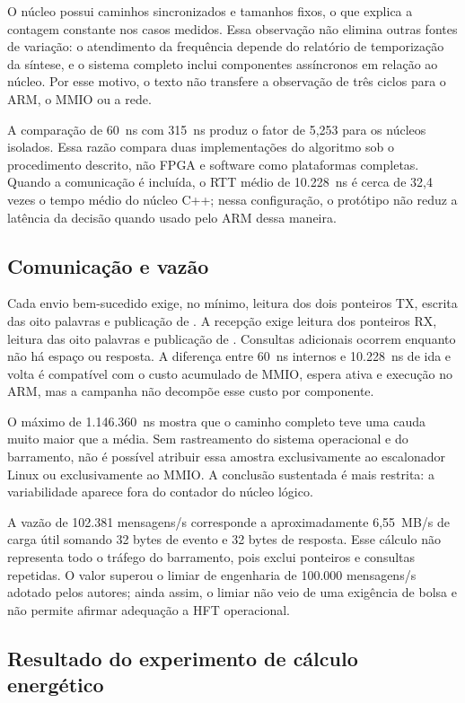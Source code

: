 O núcleo possui caminhos sincronizados e tamanhos fixos, o que explica a contagem constante nos casos medidos. Essa observação não elimina outras fontes de variação: o atendimento da frequência depende do relatório de temporização da síntese, e o sistema completo inclui componentes assíncronos em relação ao núcleo. Por esse motivo, o texto não transfere a observação de três ciclos para o ARM, o MMIO ou a rede.

A comparação de 60~ns com 315~ns produz o fator de 5,253 para os núcleos isolados. Essa razão compara duas implementações do algoritmo sob o procedimento descrito, não FPGA e software como plataformas completas. Quando a comunicação é incluída, o RTT médio de 10.228~ns é cerca de 32,4 vezes o tempo médio do núcleo C++; nessa configuração, o protótipo não reduz a latência da decisão quando usado pelo ARM dessa maneira.

\subsection{Comunicação e vazão}\label{subsec:gargaloMMIO}

Cada envio bem-sucedido exige, no mínimo, leitura dos dois ponteiros TX, escrita das oito palavras e publicação de . A recepção exige leitura dos ponteiros RX, leitura das oito palavras e publicação de . Consultas adicionais ocorrem enquanto não há espaço ou resposta. A diferença entre 60~ns internos e 10.228~ns de ida e volta é compatível com o custo acumulado de MMIO, espera ativa e execução no ARM, mas a campanha não decompõe esse custo por componente.

O máximo de 1.146.360~ns mostra que o caminho completo teve uma cauda muito maior que a média. Sem rastreamento do sistema operacional e do barramento, não é possível atribuir essa amostra exclusivamente ao escalonador Linux ou exclusivamente ao MMIO. A conclusão sustentada é mais restrita: a variabilidade aparece fora do contador do núcleo lógico.

A vazão de 102.381 mensagens/s corresponde a aproximadamente 6,55~MB/s de carga útil somando 32 bytes de evento e 32 bytes de resposta. Esse cálculo não representa todo o tráfego do barramento, pois exclui ponteiros e consultas repetidas. O valor superou o limiar de engenharia de 100.000 mensagens/s adotado pelos autores; ainda assim, o limiar não veio de uma exigência de bolsa e não permite afirmar adequação a HFT operacional.

\subsection{Resultado do experimento de cálculo energético}\label{sec:energiaBenchmark}


